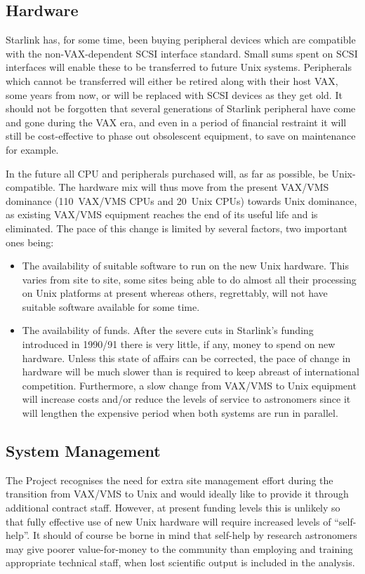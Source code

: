 \subsection{Hardware}
Starlink has, for some time, been buying peripheral devices which
are compatible with the non-VAX-dependent SCSI interface standard.
Small sums spent on SCSI interfaces will enable these to be transferred
to future Unix systems.  Peripherals which cannot be transferred will
either be retired along with their host VAX, some years from now, or
will be replaced with SCSI devices as they get old.  It should not be
forgotten that several generations of Starlink peripheral have come and
gone during the VAX era, and even in a period of financial restraint it
will still be cost-effective to phase out obsolescent equipment, to save
on maintenance for example.

In the future all CPU and peripherals purchased will, as far as
possible, be Unix-compatible.  The hardware mix will thus move from the
present VAX/VMS dominance (110~VAX/VMS CPUs and 20~Unix CPUs) towards
Unix dominance, as existing VAX/VMS equipment reaches the end of its
useful life and is eliminated.  The pace of this change is limited by
several factors, two important ones being:
\begin{itemize}
\item The availability of suitable software to run on the new Unix
hardware.  This varies from site to site, some sites being able to do
almost all their processing on Unix platforms at present whereas others,
regrettably, will not have suitable software available for some time.
\item The availability of funds.  After the severe cuts in Starlink's
funding introduced in 1990/91 there is very little, if any, money to
spend on new hardware.  Unless this state of affairs can be corrected,
the pace of change in hardware will be much slower than is required to
keep abreast of international competition.  Furthermore, a slow change
from VAX/VMS to Unix equipment will increase costs and/or reduce the
levels of service to astronomers since it will lengthen the expensive
period when both systems are run in parallel.
\end{itemize}

\subsection{System Management}
The Project recognises the need for extra site management effort during
the transition from VAX/VMS to Unix and would ideally like to provide it
through additional contract staff.  However, at present funding levels
this is unlikely so that fully effective use of new Unix hardware will
require increased levels of ``self-help''.  It should of course be borne
in mind that self-help by research astronomers may give poorer
value-for-money to the community than employing and training appropriate
technical staff, when lost scientific output is included in the analysis.

